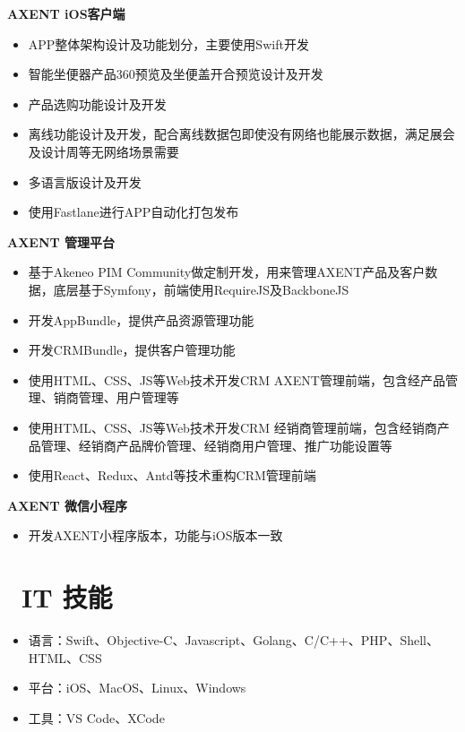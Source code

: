 \documentclass{resume}
\begin{document}

\begin{onehalfspacing}
    \textbf{AXENT iOS客户端}
    \begin{itemize}
        \item APP整体架构设计及功能划分，主要使用Swift开发
        \item 智能坐便器产品360预览及坐便盖开合预览设计及开发
        \item 产品选购功能设计及开发
        \item 离线功能设计及开发，配合离线数据包即使没有网络也能展示数据，满足展会及设计周等无网络场景需要
        \item 多语言版设计及开发
        \item 使用Fastlane进行APP自动化打包发布
    \end{itemize}
\end{onehalfspacing}

\begin{onehalfspacing}
    \textbf{AXENT 管理平台}
    \begin{itemize}
        \item 基于Akeneo PIM Community做定制开发，用来管理AXENT产品及客户数据，底层基于Symfony，前端使用RequireJS及BackboneJS
        \item 开发AppBundle，提供产品资源管理功能
        \item 开发CRMBundle，提供客户管理功能
        \item 使用HTML、CSS、JS等Web技术开发CRM AXENT管理前端，包含经产品管理、销商管理、用户管理等
        \item 使用HTML、CSS、JS等Web技术开发CRM 经销商管理前端，包含经销商产品管理、经销商产品牌价管理、经销商用户管理、推广功能设置等
        \item 使用React、Redux、Antd等技术重构CRM管理前端
    \end{itemize}
\end{onehalfspacing}

\begin{onehalfspacing}
    \textbf{AXENT 微信小程序}
    \begin{itemize}
        \item 开发AXENT小程序版本，功能与iOS版本一致
    \end{itemize}
\end{onehalfspacing}

\section{\faCogs\ IT 技能}
\begin{itemize}[parsep=0.5ex]
    \item 语言：Swift、Objective-C、Javascript、Golang、C/C++、PHP、Shell、HTML、CSS
    \item 平台：iOS、MacOS、Linux、Windows
    \item 工具：VS Code、XCode
\end{itemize}
\end{document}
